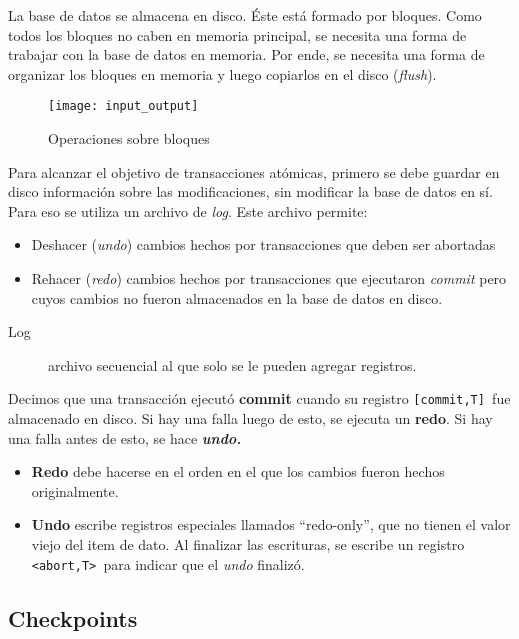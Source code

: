 \documentclass[a4paper, twoside]{article}
\begin{document}
La base de datos se almacena en disco. Éste está formado por bloques.
Como todos los bloques no caben en memoria principal, se necesita
una forma de trabajar con la base de datos en memoria. Por ende, se
necesita una forma de organizar los bloques en memoria y luego copiarlos
en el disco (\emph{flush}).

\begin{figure}[H]
\noindent \begin{centering}
\texttt{[image: input\_output]}
\par\end{centering}

\protect\caption{Operaciones sobre bloques}


\end{figure}


Para alcanzar el objetivo de transacciones atómicas, primero se debe
guardar en disco información sobre las modificaciones, sin modificar
la base de datos en sí. Para eso se utiliza un archivo de \emph{log}.
Este archivo permite: 
\begin{itemize}
\item Deshacer (\emph{undo}) cambios hechos por transacciones que deben
ser abortadas
\item Rehacer (\emph{redo}) cambios hechos por transacciones que ejecutaron
\emph{commit} pero cuyos cambios no fueron almacenados en la base
de datos en disco.\end{itemize}
\begin{description}
\item [{Log}] archivo secuencial al que solo se le pueden agregar registros.
\end{description}
Decimos que una transacción ejecutó \textbf{commit} cuando su registro
\texttt{{[}commit,T{]} }fue almacenado en disco. Si hay una falla
luego de esto, se ejecuta un \textbf{redo}. Si hay una falla antes
de esto, se hace \textbf{\emph{undo.}}
\begin{itemize}
\item \textbf{Redo} debe hacerse en el orden en el que los cambios fueron
hechos originalmente.
\item \textbf{Undo }escribe registros especiales llamados ``redo-only'',
que no tienen el valor viejo del item de dato. Al finalizar las escrituras,
se escribe un registro \texttt{<abort,T> }para indicar que el \emph{undo
}finalizó.
\end{itemize}

\subsection{Checkpoints}
\end{document}
